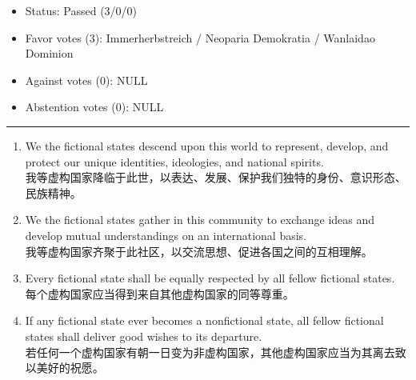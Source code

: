 



\begin{itemize}
	\item Status: Passed (3/0/0)
	\item Favor votes (3): Immerherbstreich / Neoparia Demokratia / Wanlaidao Dominion
	\item Against votes (0): NULL
	\item Abstention votes (0): NULL
\end{itemize}

\hrule

\begin{enumerate}
	\item We the fictional states descend upon this world to represent, develop, and protect
	      our unique identities, ideologies, and national spirits.\\
	      我等虚构国家降临于此世，以表达、发展、保护我们独特的身份、意识形态、民族精神。
	\item We the fictional states gather in this community to exchange ideas and develop mutual understandings on an international basis.\\
	      我等虚构国家齐聚于此社区，以交流思想、促进各国之间的互相理解。
	\item Every fictional state shall be equally respected by all fellow fictional states.\\
	      每个虚构国家应当得到来自其他虚构国家的同等尊重。
	\item If any fictional state ever becomes a nonfictional state,
	      all fellow fictional states shall deliver good wishes to its departure.\\
	      若任何一个虚构国家有朝一日变为非虚构国家，其他虚构国家应当为其离去致以美好的祝愿。
\end{enumerate}




